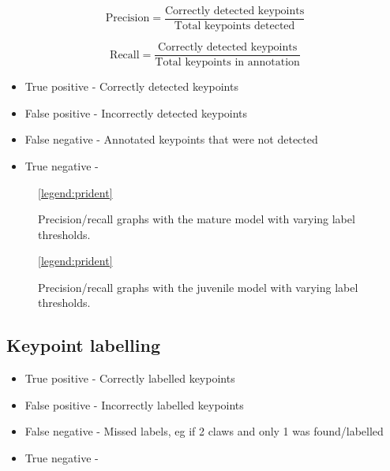 \begin{equation}
\text{Precision} = \frac{\text{Correctly detected keypoints}}{\text{Total keypoints detected}}
\end{equation}

\begin{equation}
\text{Recall} = \frac{\text{Correctly detected keypoints}}{\text{Total keypoints in annotation}}
\end{equation}

\begin{itemize}
\item True positive - Correctly detected keypoints
\item False positive - Incorrectly detected keypoints
\item False negative - Annotated keypoints that were not detected
\item True negative - 
\end{itemize}



\begin{figure}[H]
\centering
{}
\ref{legend:prident}
\caption{Precision/recall graphs with the mature model with varying label thresholds.}
\end{figure}

\begin{figure}[H]
\centering
{}
\ref{legend:prident}
\caption{Precision/recall graphs with the juvenile model with varying label thresholds.}
\end{figure}

\subsection{Keypoint labelling}


\begin{itemize}
\item True positive - Correctly labelled keypoints
\item False positive - Incorrectly labelled keypoints
\item False negative - Missed labels, eg if 2 claws and only 1 was found/labelled
\item True negative - 
\end{itemize}



